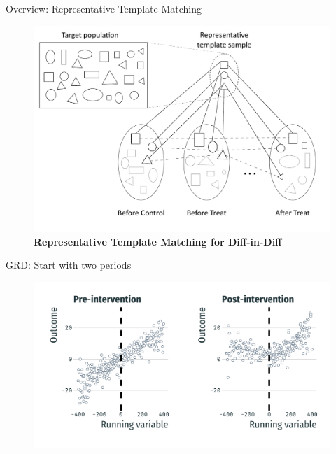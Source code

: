 \documentclass[usenames,dvipsnames,11pt,aspectratio=169]{beamer}
\begin{document}
\begin{frame}{Overview: Representative Template Matching}
\begin{figure}[!htb]
\centering
\caption*{\textbf{Representative Template Matching for Diff-in-Diff}}
   \includegraphics[height=0.8\textheight]{figures/diagram3_dd.pdf}
\end{figure}
\end{frame}

\begin{frame}{GRD: Start with two periods}
\begin{figure}[!htb]
\centering
   \includegraphics[width=\textwidth]{figures/pre_post0.pdf}
\end{figure}
\end{frame}
\end{document}
